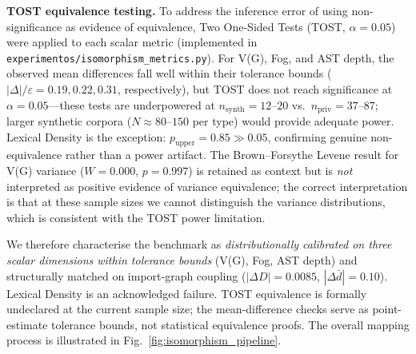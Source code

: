 \documentclass{ieeeaccess}
\begin{document}
\textbf{TOST equivalence testing.} To address the inference error of using non-significance as evidence of equivalence, Two One-Sided Tests (TOST, $\alpha=0.05$) were applied to each scalar metric (implemented in \texttt{experimentos/isomorphism\_metrics.py}). For V(G), Fog, and AST depth, the observed mean differences fall well within their tolerance bounds ($|\Delta|/\varepsilon = 0.19, 0.22, 0.31$, respectively), but TOST does not reach significance at $\alpha=0.05$---these tests are underpowered at $n_\text{synth}=12$--$20$ vs.\ $n_\text{priv}=37$--$87$; larger synthetic corpora ($N\approx80$--$150$ per type) would provide adequate power. Lexical Density is the exception: $p_\text{upper}=0.85 \gg 0.05$, confirming genuine non-equivalence rather than a power artifact. The Brown--Forsythe Levene result for V(G) variance ($W=0.000$, $p=0.997$) is retained as context but is \emph{not} interpreted as positive evidence of variance equivalence; the correct interpretation is that at these sample sizes we cannot distinguish the variance distributions, which is consistent with the TOST power limitation.

We therefore characterise the benchmark as \emph{distributionally calibrated on three scalar dimensions within tolerance bounds} (V(G), Fog, AST depth) and structurally matched on import-graph coupling ($|\Delta D|=0.0085$, $|\Delta\bar{d}|=0.10$). Lexical Density is an acknowledged failure. TOST equivalence is formally undeclared at the current sample size; the mean-difference checks serve as point-estimate tolerance bounds, not statistical equivalence proofs. The overall mapping process is illustrated in Fig.~\ref{fig:isomorphism_pipeline}.
\end{document}
